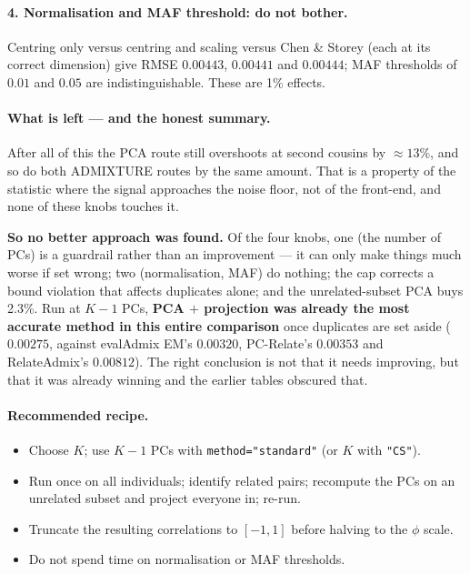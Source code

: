 \documentclass[10pt,a4paper]{article}
\newenvironment{tightitem}{%
  \begin{itemize}\setlength{\itemsep}{1pt}\setlength{\parskip}{0pt}%
  \setlength{\topsep}{3pt}\setlength{\parsep}{0pt}}{\end{itemize}}
\begin{document}
\paragraph{4. Normalisation and MAF threshold: do not bother.} Centring only versus centring and scaling
versus Chen \& Storey (each at its correct dimension) give RMSE $0.00443$, $0.00441$ and $0.00444$; MAF
thresholds of $0.01$ and $0.05$ are indistinguishable. These are 1\% effects.

\paragraph{What is left --- and the honest summary.} After all of this the PCA route still overshoots at
second cousins by $\approx13\%$, and so do both ADMIXTURE routes by the same amount. That is a property of
the statistic where the signal approaches the noise floor, not of the front-end, and none of these knobs
touches it.

\textbf{So no better approach was found.} Of the four knobs, one (the number of PCs) is a guardrail rather
than an improvement --- it can only make things much worse if set wrong; two (normalisation, MAF) do nothing;
the cap corrects a bound violation that affects duplicates alone; and the unrelated-subset PCA buys 2.3\%.
Run at $K-1$ PCs, \textbf{PCA $+$ projection was already the most accurate method in this entire comparison}
once duplicates are set aside ($0.00275$, against evalAdmix EM's $0.00320$, PC-Relate's $0.00353$ and
RelateAdmix's $0.00812$). The right conclusion is not that it needs improving, but that it was already
winning and the earlier tables obscured that.

\paragraph{Recommended recipe.}
\begin{tightitem}
  \item Choose $K$; use $K-1$ PCs with \texttt{method="standard"} (or $K$ with \texttt{"CS"}).
  \item Run once on all individuals; identify related pairs; recompute the PCs on an unrelated subset and
  project everyone in; re-run.
  \item Truncate the resulting correlations to $[-1,1]$ before halving to the $\phi$ scale.
  \item Do not spend time on normalisation or MAF thresholds.
\end{tightitem}
\end{document}
